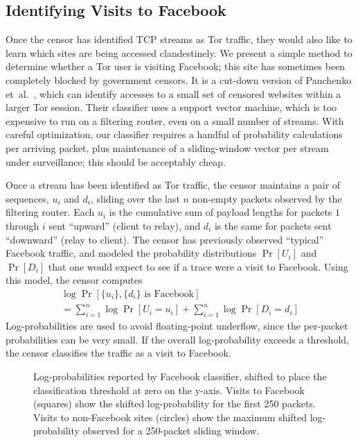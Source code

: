 \subsection{Identifying Visits to Facebook}\label{s:detect-fb}

Once the censor has identified TCP streams as Tor traffic, they would
also like to learn which sites are being accessed clandestinely.  We
present a simple method to determine whether a Tor user is visiting
Facebook; this site has sometimes been completely blocked by
government censors.  It is a cut-down version of Panchenko
et~al.~\cite{a-finger-onion}, which can identify accesses to a small
set of censored websites within a larger Tor session.  Their
classifier uses a support vector machine, which is too expensive to
run on a filtering router, even on a small number of streams. With
careful optimization, our classifier requires a handful of probability
calculations per arriving packet, plus maintenance of a sliding-window
vector per stream under surveillance; this should be acceptably cheap.

Once a stream has been identified as Tor traffic, the censor maintains
a pair of sequences, ${u_i}$ and ${d_i}$, sliding over the last $n$
non-empty packets observed by the filtering router.  Each $u_i$ is the
cumulative sum of payload lengths for packets $1$ through $i$ sent
“upward” (client to relay), and $d_i$ is the same for packets sent
“downward” (relay to client). The censor has previously observed
“typical” Facebook traffic, and modeled the probability distributions
$\Pr[U_i]$ and $\Pr[D_i]$ that one would expect to see if a trace were
a visit to Facebook.  Using this model, the censor computes
\begin{multline*}
\log \Pr\left[\{u_i\},\{d_i\} \text{ is Facebook}\right]\\
= \sum_{i=1}^n \log \Pr[U_i=u_i] + \sum_{i=1}^n \log \Pr[D_i=d_i]
\end{multline*}
Log-probabilities are used to avoid floating-point underflow, since
the per-packet probabilities can be very small.  If the overall
log-probability exceeds a threshold, the censor classifies the traffic
as a visit to Facebook.

\begin{figure}[h]
\centering

\caption{Log-probabilities reported by Facebook classifier, shifted to
  place the classification threshold at zero on the y-axis. Visits to
  Facebook (squares) show the shifted log-probability for the first
  250 packets. Visits to non-Facebook sites (circles) show the maximum
  shifted log-probability observed for a 250-packet sliding
  window.}
\label{f:prob-facebook}
\end{figure}

